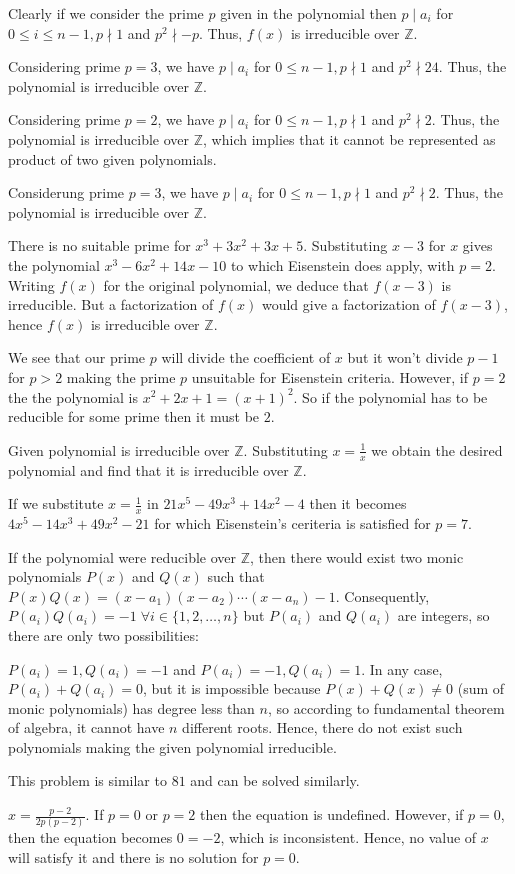   Clearly if we consider the prime $p$ given in the polynomial then $p\mid a_i$ for $0\leq i\leq n - 1,
  p\nmid 1$ and $p^2\nmid -p$. Thus, $f(x)$ is irreducible over $\mathbb{Z}$.
\item Considering prime $p = 3$, we  have $p\mid a_i$ for $0\leq n - 1, p\nmid 1$ and $p^2\nmid24$. Thus,
  the polynomial is irreducible over $\mathbb{Z}$.
\item Considering prime $p = 2$, we  have $p\mid a_i$ for $0\leq n - 1, p\nmid 1$ and $p^2\nmid2$. Thus,
  the polynomial is irreducible over $\mathbb{Z}$, which implies that it cannot be represented as product of
  two given polynomials.
\item Considerung prime $p = 3$, we  have $p\mid a_i$ for $0\leq n - 1, p\nmid 1$ and $p^2\nmid2$. Thus,
  the polynomial is irreducible over $\mathbb{Z}$.
\item There is no suitable prime for $x^3 + 3x^2 + 3x + 5$. Substituting $x - 3$ for $x$ gives the
  polynomial $x^3 - 6x^2 + 14x - 10$ to which Eisenstein does apply, with $p = 2$. Writing $f(x)$ for the
  original polynomial, we deduce that $f(x - 3)$ is irreducible. But a factorization of $f(x)$ would give a
  factorization of $f(x - 3)$, hence $f(x)$ is irreducible over $\mathbb{Z}$.
\item We see that our prime $p$ will divide the coefficient of $x$ but it won't divide $p - 1$ for $p >
  2$ making the prime $p$ unsuitable for Eisenstein criteria. However, if $p = 2$ the the polynomial is $x^2
  + 2x + 1 = (x + 1)^2$. So if the polynomial has to be
  reducible for some prime then it must be $2$.
\item Given polynomial is irreducible over $\mathbb{Z}$. Substituting $x = \frac{1}{x}$ we obtain the
  desired polynomial and find that it is irreducible over $\mathbb{Z}$.

  If we substitute $x = \frac{1}{x}$ in $21x^5 - 49x^3 + 14x^2 - 4$ then it becomes $4x^5 - 14x^3 + 49x^2 -
  21$ for which Eisenstein's ceriteria is satisfied for $p = 7$.
\item If the polynomial were reducible over $\mathbb{Z}$, then there would exist two monic polynomials
  $P(x)$ and $Q(x)$ such that $P(x)Q(x) = (x - a_1)(x - a_2)\cdots(x - a_n) - 1$. Consequently,
  $P(a_i)Q(a_i) = -1\;\forall i\in\{1, 2, \ldots, n\}$ but $P(a_i)$ and $Q(a_i)$ are integers, so there are
  only two possibilities:

  $P(a_i) = 1, Q(a_i) = -1$ and $P(a_i) = -1, Q(a_i) = 1$. In any case, $P(a_i) + Q(a_i) = 0$, but it is
  impossible because $P(x) + Q(x)\neq 0$ (sum of monic polynomials) has degree less than $n$, so according
  to fundamental theorem of algebra, it cannot have $n$ different roots. Hence, there do not exist such
  polynomials making the given polynomial irreducible.
\item This problem is similar to $81$ and can be solved similarly.
\item $x = \frac{p - 2}{2p(p - 2)}$. If $p = 0$ or $p = 2$ then the equation is undefined. However, if $p =
  0$, then the equation becomes $0 = -2$, which is inconsistent. Hence, no value of $x$ will satisfy it and
  there is no solution for $p = 0$.

